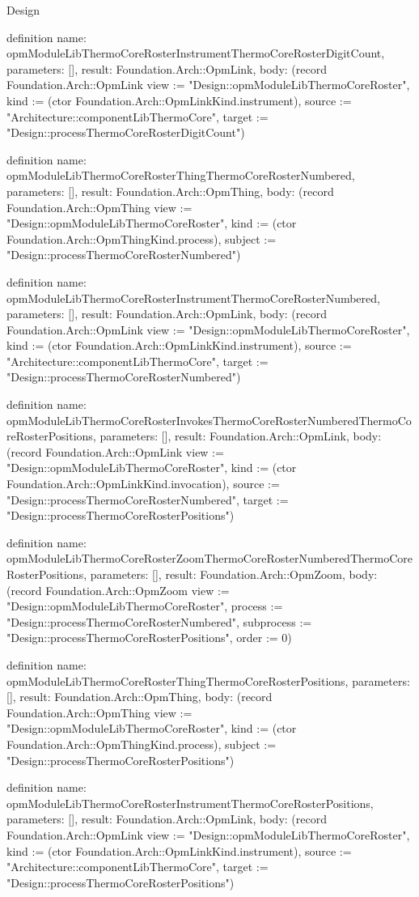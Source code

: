 \begin{lexlean}{Design}
\begin{semanticmodule}
definition{
  name: opmModuleLibThermoCoreRosterInstrumentThermoCoreRosterDigitCount,
  parameters: [],
  result: Foundation.Arch::OpmLink,
  body: (record Foundation.Arch::OpmLink {view := "Design::opmModuleLibThermoCoreRoster", kind := (ctor Foundation.Arch::OpmLinkKind.instrument), source := "Architecture::componentLibThermoCore", target := "Design::processThermoCoreRosterDigitCount"})
}

definition{
  name: opmModuleLibThermoCoreRosterThingThermoCoreRosterNumbered,
  parameters: [],
  result: Foundation.Arch::OpmThing,
  body: (record Foundation.Arch::OpmThing {view := "Design::opmModuleLibThermoCoreRoster", kind := (ctor Foundation.Arch::OpmThingKind.process), subject := "Design::processThermoCoreRosterNumbered"})
}

definition{
  name: opmModuleLibThermoCoreRosterInstrumentThermoCoreRosterNumbered,
  parameters: [],
  result: Foundation.Arch::OpmLink,
  body: (record Foundation.Arch::OpmLink {view := "Design::opmModuleLibThermoCoreRoster", kind := (ctor Foundation.Arch::OpmLinkKind.instrument), source := "Architecture::componentLibThermoCore", target := "Design::processThermoCoreRosterNumbered"})
}

definition{
  name: opmModuleLibThermoCoreRosterInvokesThermoCoreRosterNumberedThermoCoreRosterPositions,
  parameters: [],
  result: Foundation.Arch::OpmLink,
  body: (record Foundation.Arch::OpmLink {view := "Design::opmModuleLibThermoCoreRoster", kind := (ctor Foundation.Arch::OpmLinkKind.invocation), source := "Design::processThermoCoreRosterNumbered", target := "Design::processThermoCoreRosterPositions"})
}

definition{
  name: opmModuleLibThermoCoreRosterZoomThermoCoreRosterNumberedThermoCoreRosterPositions,
  parameters: [],
  result: Foundation.Arch::OpmZoom,
  body: (record Foundation.Arch::OpmZoom {view := "Design::opmModuleLibThermoCoreRoster", process := "Design::processThermoCoreRosterNumbered", subprocess := "Design::processThermoCoreRosterPositions", order := 0})
}

definition{
  name: opmModuleLibThermoCoreRosterThingThermoCoreRosterPositions,
  parameters: [],
  result: Foundation.Arch::OpmThing,
  body: (record Foundation.Arch::OpmThing {view := "Design::opmModuleLibThermoCoreRoster", kind := (ctor Foundation.Arch::OpmThingKind.process), subject := "Design::processThermoCoreRosterPositions"})
}

definition{
  name: opmModuleLibThermoCoreRosterInstrumentThermoCoreRosterPositions,
  parameters: [],
  result: Foundation.Arch::OpmLink,
  body: (record Foundation.Arch::OpmLink {view := "Design::opmModuleLibThermoCoreRoster", kind := (ctor Foundation.Arch::OpmLinkKind.instrument), source := "Architecture::componentLibThermoCore", target := "Design::processThermoCoreRosterPositions"})
}


\end{semanticmodule}
\end{lexlean}

